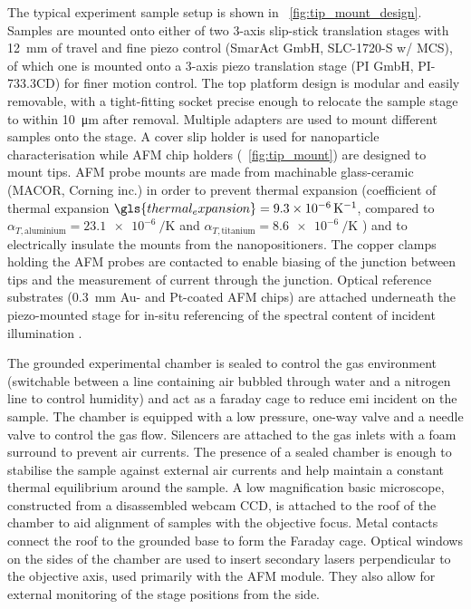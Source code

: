 \documentclass{article}
\begin{document}
The typical experiment sample setup is shown in \figurename~\ref{fig:tip_mount_design}. Samples are mounted onto either of two 3-axis slip-stick translation stages with \SI{12}{mm} of travel and fine piezo control (SmarAct GmbH, SLC-1720-S w/ MCS), of which one is mounted onto a 3-axis piezo translation stage (PI GmbH, PI-733.3CD) for finer motion control. The top platform design is modular and easily removable, with a tight-fitting socket precise enough to relocate the sample stage to within \SI{10}{\micro\metre} after removal. Multiple adapters are used to mount different samples onto the stage. A cover slip holder is used for nanoparticle characterisation while AFM chip holders (\figurename~\ref{fig:tip_mount}) are designed to mount tips.
AFM probe mounts are made from machinable glass-ceramic (MACOR, Corning inc.) in order to prevent thermal expansion (coefficient of thermal expansion $\gls{thermal_expansion}=\SI{9.3e-6}{\per\kelvin}$, compared to $\alpha_{T,\mathrm{aluminium}}=\SI{23.1e-6}{\per\kelvin}$ and $\alpha_{T, \mathrm{titanium}}=\SI{8.6e-6}{\per\kelvin}$ \cite{haynes2013crc}) and to electrically insulate the mounts from the nanopositioners. The copper clamps holding the AFM probes are contacted to enable biasing of the junction between tips and the measurement of current through the junction. Optical reference substrates (\SI{0.3}{mm} Au- and Pt-coated AFM chips) are attached underneath the piezo-mounted stage for {\color{red}in-situ} referencing of the spectral content of incident illumination .

The grounded experimental chamber is sealed to control the gas environment (switchable between a line containing air bubbled through water and a nitrogen line to control humidity) and act as a faraday cage to reduce \gls{emi} incident on the sample. The chamber is equipped with a low pressure, one-way valve and a needle valve to control the gas flow. Silencers are attached to the gas inlets with a foam surround to prevent air currents. The presence of a sealed chamber is enough to stabilise the sample against external air currents and help maintain a constant thermal equilibrium around the sample. A low magnification basic microscope, constructed from a disassembled webcam CCD, is attached to the roof of the chamber to aid alignment of samples with the objective focus. Metal contacts connect the roof to the grounded base to form the Faraday cage. Optical windows on the sides of the chamber are used to insert secondary lasers perpendicular to the objective axis, used primarily with the AFM module. They also allow for external monitoring of the stage positions from the side.

\FloatBarrier
\end{document}
